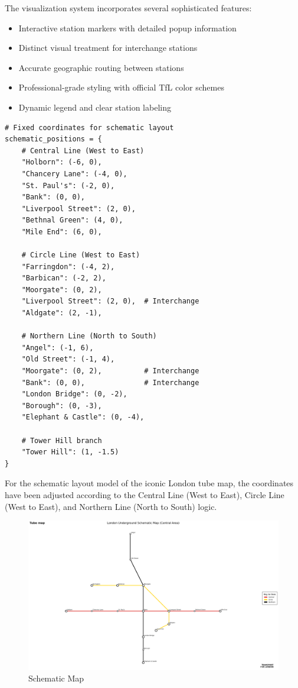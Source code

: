 \documentclass{article}
\begin{document}
The visualization system incorporates several sophisticated features:
\begin{itemize}
    \item Interactive station markers with detailed popup information
    \item Distinct visual treatment for interchange stations
    \item Accurate geographic routing between stations
    \item Professional-grade styling with official TfL color schemes
    \item Dynamic legend and clear station labeling
\end{itemize}

\begin{lstlisting}[style=PythonStyle, caption={Schematic Layout Coordinates}]
# Fixed coordinates for schematic layout
schematic_positions = {
    # Central Line (West to East)
    "Holborn": (-6, 0),
    "Chancery Lane": (-4, 0),
    "St. Paul's": (-2, 0),
    "Bank": (0, 0),
    "Liverpool Street": (2, 0),
    "Bethnal Green": (4, 0),
    "Mile End": (6, 0),
    
    # Circle Line (West to East)
    "Farringdon": (-4, 2),
    "Barbican": (-2, 2),
    "Moorgate": (0, 2),
    "Liverpool Street": (2, 0),  # Interchange
    "Aldgate": (2, -1),
    
    # Northern Line (North to South)
    "Angel": (-1, 6),
    "Old Street": (-1, 4),
    "Moorgate": (0, 2),          # Interchange
    "Bank": (0, 0),              # Interchange
    "London Bridge": (0, -2),
    "Borough": (0, -3),
    "Elephant & Castle": (0, -4),
    
    # Tower Hill branch
    "Tower Hill": (1, -1.5)
}
\end{lstlisting}

For the schematic layout model of the iconic London tube map, the coordinates have been adjusted according to the Central Line (West to East), Circle Line (West to East), and Northern Line (North to South) logic.

\begin{figure}[H]
    \centering
    \includegraphics[width=1\linewidth]{Images/TfL-Schematic.png}
    \caption{Schematic Map}
    \label{fig:schematic_map}
\end{figure}
\end{document}
